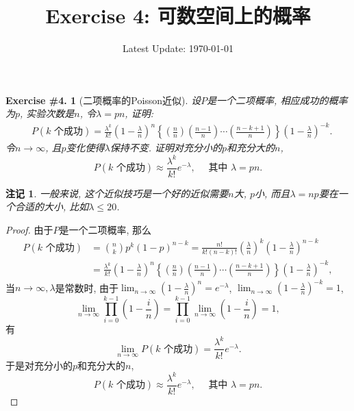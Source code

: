 \documentclass[UTF8, a4paper]{article}
\title{Exercise 4: 可数空间上的概率}
\author{}
\date{Latest Update: \today}
\newtheorem{exercise}{Exercise \#4.}
\newtheorem*{remark}{注记}
\begin{document}
\maketitle

\begin{framed}
\begin{exercise}[二项概率的Poisson近似]
    设\(P\)是一个二项概率, 相应成功的概率为\(p\), 实验次数是\(n\), 令\(\lambda = pn\), 证明: 
$$
\begin{aligned}
& P(k \text { 个成功})=\frac{\lambda^k}{k!}\left(1-\frac{\lambda}{n}\right)^n\left\{\left(\frac{n}{n}\right)\left(\frac{n-1}{n}\right) \cdots\left(\frac{n-k+1}{n}\right)\right\}\left(1-\frac{\lambda}{n}\right)^{-k} .
\end{aligned}
$$
令\(n\to \infty\), 且\(p\)变化使得\(\lambda\)保持不变. 证明对充分小的\(p\)和充分大的\(n\), 
$$
P(k \text { 个成功}) \approx \frac{\lambda^k}{k!} e^{-\lambda}, \quad \text { 其中 } \lambda=p n.
$$
\end{exercise}
\end{framed}


\begin{remark}
一般来说, 这个近似技巧是一个好的近似需要\(n\)大, \(p\)小, 而且\(\lambda = np\)要在一个合适的大小, 比如\(\lambda \leq 20\).
\end{remark}

\begin{proof}
由于\(P\)是一个二项概率, 那么
$$
\begin{aligned}
    P(k \text { 个成功})&=\binom{n}{k} p^k(1-p)^{n-k} = \frac{n!}{k!(n-k)!} \left(\frac{\lambda}{n}\right)^k\left(1 - \frac{\lambda}{n}\right)^{n-k} \\
    &= \frac{\lambda^k}{k!}\left(1-\frac{\lambda}{n}\right)^n\left\{\left(\frac{n}{n}\right)\left(\frac{n-1}{n}\right) \cdots\left(\frac{n-k+1}{n}\right)\right\}\left(1-\frac{\lambda}{n}\right)^{-k},
\end{aligned}
$$
当\(n\to\infty, \lambda\)是常数时, 由于\(\lim_{n\to \infty} \left(1 - \frac{\lambda}{n}\right)^n = e^{-\lambda}\), \(\lim_{n\to \infty} \left(1 - \frac{\lambda}{n}\right)^{-k} = 1\),
$$
\lim_{n\to\infty} \prod_{i=0}^{k-1} \left(1 - \frac{i}{n}\right) = \prod_{i=0}^{k-1} \lim_{n\to\infty} \left(1 - \frac{i}{n}\right)= 1,
$$
有
$$
\lim_{n\to\infty}P(k \text { 个成功}) = \frac{\lambda^k}{k!} e^{-\lambda}.
$$
于是对充分小的\(p\)和充分大的\(n\), 
$$
P(k \text { 个成功}) \approx \frac{\lambda^k}{k!} e^{-\lambda}, \quad \text { 其中 } \lambda=p n.
$$
\end{proof}
\end{document}
